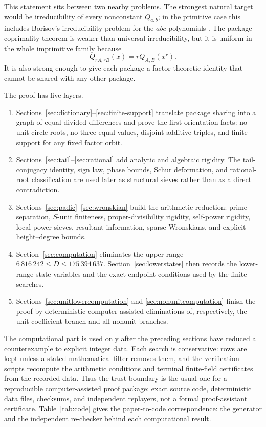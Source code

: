 \documentclass[11pt]{article}
\numberwithin{equation}{section}
\theoremstyle{definition}
\begin{document}
This statement sits between two nearby problems.  The strongest natural target
would be irreducibility of every nonconstant \(Q_{a,b}\); in the primitive
case this includes Borisov's irreducibility problem for the \(abc\)-polynomials
\cite{Borisov1998}.  The package-coprimality theorem is weaker than universal
irreducibility, but it is uniform in the whole imprimitive family because
\[
 Q_{rA,rB}(x)=rQ_{A,B}(x^r).
\]
It is also strong enough to give each package a factor-theoretic identity that
cannot be shared with any other package.

The proof has five layers.
\begin{enumerate}[label=(\arabic*)]
\item Sections~\ref{sec:dictionary}--\ref{sec:finite-support} translate
package sharing into a graph of equal divided differences and prove the first
orientation facts: no unit-circle roots, no three equal values, disjoint
additive triples, and finite support for any fixed factor orbit.
\item Sections~\ref{sec:tail}--\ref{sec:rational} add analytic and
algebraic rigidity.  The tail-conjugacy identity, sign law, phase bounds,
Schur deformation, and rational-root classification are used later as
structural sieves rather than as a direct contradiction.
\item Sections~\ref{sec:padic}--\ref{sec:wronskian} build the arithmetic
reduction: prime separation,
\(S\)-unit finiteness, proper-divisibility rigidity, self-power rigidity, local
power sieves, resultant information, sparse Wronskians, and explicit
height--degree bounds.
\item Section~\ref{sec:computation} eliminates the upper range
\(6\,816\,242\leq D\leq175\,394\,637\).  Section~\ref{sec:lowerstates}
then records the lower-range state variables and the exact endpoint conditions
used by the finite searches.
\item Sections~\ref{sec:unitlowercomputation} and
\ref{sec:nonunitcomputation} finish the proof by deterministic
computer-assisted eliminations of, respectively, the unit-coefficient branch
and all nonunit branches.
\end{enumerate}

The computational part is used only after the preceding sections have reduced
a counterexample to explicit integer data.  Each search is conservative: rows
are kept unless a stated mathematical filter removes them, and the verification
scripts recompute the arithmetic conditions and terminal finite-field
certificates from the recorded data.  Thus the trust boundary is the usual one
for a reproducible computer-assisted proof package: exact source code,
deterministic data files, checksums, and independent replayers, not a formal
proof-assistant certificate.  Table~\ref{tab:code} gives the paper-to-code
correspondence: the generator and the independent re-checker behind each
computational result.
\end{document}
